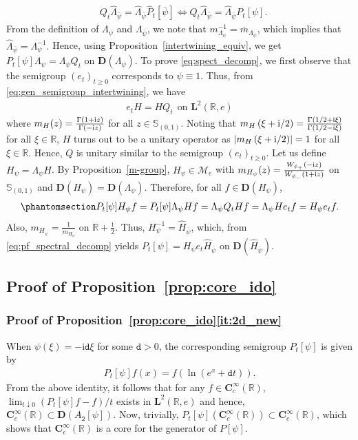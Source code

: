 \documentclass[12pt]{amsart}
\newcommand{\hlabel}{\phantomsection\label}
\newcommand{\hptg}[2]{\hypertarget{#1}{#2}}
\numberwithin{equation}{section}
\newcommand{\bb}{\mathbb}
\renewcommand{\ge}{\geqslant}
\newcommand{\ov}{\overline}
\newcommand{\ttt}{\mathtt}
\newcommand{\bmrm}[2][2]{\mathbf{#2}^{#1}}
\newcommand{\Hpsi}{H_\psi}
\newcommand{\Hpsinv}{H^{-1}_\psi}
\newcommand{\Hpsid}{\widehat{H}_{\ov{\psi}}}
\newcommand{\C}{\mathbf{C}}
\newcommand{\D}{\mathbf{D}}
\newcommand{\LL}{\Lambda}
\renewcommand{\i}{\mathrm{i}}
\newcommand{\LRe}{\bmrm{L}(\bb{R},e)}
\theoremstyle{definition}
\theoremstyle{assump}
\theoremstyle{remark}
\begin{document}
{\begin{align*}
	&Q_t\widehat{\Lambda}_{\ov{\psi}}=\widehat{\Lambda}_{\ov{\psi}} \widehat{P}_t[\ov{\psi}]
	\iff  Q_t\widehat{\Lambda}_{\ov{\psi}}=\widehat{\Lambda}_{\ov{\psi}} P_t[\psi]. \nonumber
\end{align*}
\hptg{C51}{From the definition of $\Lambda_\psi$ and $\Lambda_{\ov{\psi}}$, we note that $m^{-1}_{\LL_\psi}=\overline{m}_{\LL_{\overline{\psi}}}$, which implies that $\widehat{\Lambda}_{\ov{\psi}}=\Lambda^{-1}_\psi$.} Hence, using Proposition~\ref{intertwining_equiv}, we get $P_t[\psi]\Lambda_\psi=\Lambda_\psi Q_t$ on $\D(\Lambda_\psi)$. To prove \eqref{eq:spect_decomp}, we first observe that the semigroup $(e_t)_{t\ge 0}$ corresponds to $\psi\equiv 1$. Thus,  from \eqref{eq:gen_semigroup_intertwining},  we have
\begin{align*}
	e_t H=HQ_t \ \ \mbox{on \ $\bmrm{L}(\bb{R},e)$}
\end{align*}
where  $m_H(z)=\frac{\Gamma(1+{\rm{i}}z   )}{\Gamma(-{\rm{i}}z   )}$ for all $z\in\bb{S}_{(0,1)}$. Noting that $m_H\left(\xi+{\rm{i}}/2\right)=\frac{\Gamma(1/2+{\rm{i}}\xi  )}{\Gamma(1/2-{\rm{i}}\xi  )}$ for all $\xi\in\bb R$, $H$ turns out to be a unitary operator as $\left|m_{H}\left(\xi+{\rm{i}}/2\right)\right|=1$ for all $\xi\in\bb R$. Hence, $Q$ is unitary similar to the semigroup $(e_t)_{t\ge 0}$. Let us define $\Hpsi=\Lambda_\psi H$. By Proposition~\ref{m-group}, $\Hpsi\in\mathscr{M}_e$ with $m_{\Hpsi}(z)=\frac{W_{\phi_+}(-{\rm{i}}z   )}{W_{\phi_-}(1+{\rm{i}}z   )}$ on $\bb{S}_{(0,1)}$ and $\D(\Hpsi)=\D(\Lambda_\psi)$. Therefore, for all $f\in\D(\Hpsi)$,
\begin{align}\hlabel{eq:pf_spectral_decomp}
	P_t[\psi]\Hpsi f=P_t[\psi]\Lambda_\psi Hf=\Lambda_\psi Q_t Hf=\Lambda_\psi H e_t f=\Hpsi e_t f.
\end{align}
Also, $m_{H_{\ov{\psi}}}=\frac{1}{\ov{m}_{\Hpsi}}$ on $\bb{R}+\frac{\i}{2}$. Thus, $\Hpsinv=\Hpsid$, which, from \eqref{eq:pf_spectral_decomp} yields $P_t[\psi]=\Hpsi e_t\Hpsid$ on $\D(\Hpsid)$.

\subsection{Proof of Proposition~\ref{prop:core_ido}}\hlabel{ss:prop:core_ido}
\subsubsection{Proof of Proposition~\ref{prop:core_ido}\eqref{it:2d_new}}\hlabel{ss:thm_prop_core_ido} When $\psi(\xi)=-\i\ttt{d}\xi$ for some $\ttt{d}>0$, the corresponding semigroup $P_t[\psi]$ is given by
\begin{align*}
	P_t[\psi] f(x)=f(\ln(e^x+\ttt{d}t)).
\end{align*}
From the above identity, it follows that for any $f\in\C^\infty_c(\bb R)$, $\lim_{t\downarrow 0}(P_t[\psi]f-f)/t$ exists in $\LRe$ and hence, $\C^\infty_c(\bb R)\subset\D(A_{\ttt{2}}[\psi])$. Now, trivially, $P_t[\psi](\C^\infty_c(\bb{R}))\subset\C^\infty_c(\bb{R})$, which shows that $\C^\infty_c(\bb{R})$ is a core for the generator of $P[\psi]$.

}
\end{document}
